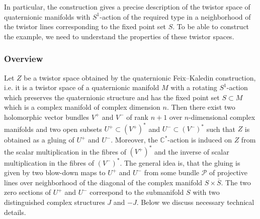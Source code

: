 \documentclass{amsart}
\begin{document}
In particular, the construction gives a precise description of the twistor space of quaternionic manifolds with $S^1$-action of the required type in a neighborhood of the twistor lines corresponding to the fixed point set $S$. To be able to construct the example, we need to understand the properties of these twistor spaces. 




\subsubsection{Overview}
Let $Z$ be a twistor space obtained by the quaternionic Feix--Kaledin construction, i.e. it is a twistor space of a quaternionic manifold $M$ with a rotating $S^1$-action which preserves the quaternionic structure and has the fixed point set $S\subset M$  which is a complex manifold of complex dimension $n$. Then there exist two holomorphic vector bundles $V^+$ and $V^-$ of rank $n+1$ over $n$-dimensional complex manifolds and two open subsets $U^+\subset (V^+)^*$ and $U^-\subset (V^-)^*$ such that $Z$ is obtained as a gluing of $U^+$ and $U^-$. Moreover, the $\mathbb{C}^*$-action is induced on $Z$ from the scalar multiplication in the fibres of $(V^+)^*$ and the inverse of scalar multiplication in the fibres of $ (V^-)^*$. The general idea is, that the gluing is given by two blow-down maps to $U^+$ and $U^-$ from some bundle $\mathcal{P}$ of projective lines over neighborhood of the diagonal of the complex manifold $S\times \overline{S}$. The two zero sections of $U^+$ and $U^-$ correspond to the submanifold $S$ with two distinguished complex structures $J$ and $-J$. Below we discuss necessary technical details. 
\end{document}
